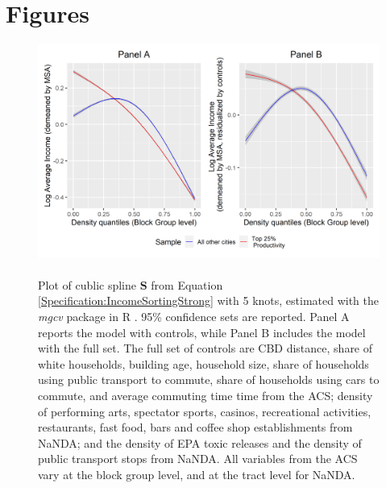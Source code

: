 \documentclass[12pt]{article}
\begin{document}
	
	\newpage
	\scriptsize
	
	
	
	\newpage
	\section*{Figures}
	
		\begin{figure}[htbp!]
		\begin{center}
			\includegraphics[width=\textwidth]{income_combined.png}
			\caption{ \\ Plot of cublic spline $\mathbf{S}$ from Equation \eqref{Specification:IncomeSortingStrong} with 5 knots, estimated with the \textit{mgcv} package in R \citep{gampackage}. 95\% confidence sets are reported. Panel A reports the model with  controls, while Panel B includes the model with the full set. The full set of controls are CBD distance, share of white households, building age, household size, share of households using public transport to commute, share of households using cars to commute, and average commuting time time from the ACS; density of performing arts, spectator sports, casinos, recreational activities, restaurants, fast food, bars and coffee shop establishments from NaNDA; and the density of EPA toxic releases and the density of public transport stops from NaNDA. All variables from the ACS vary at the block group level, and at the tract level for NaNDA.  }\label{Figure:IncomeSortingStrong}
		\end{center}
	\end{figure}
	
\end{document}
